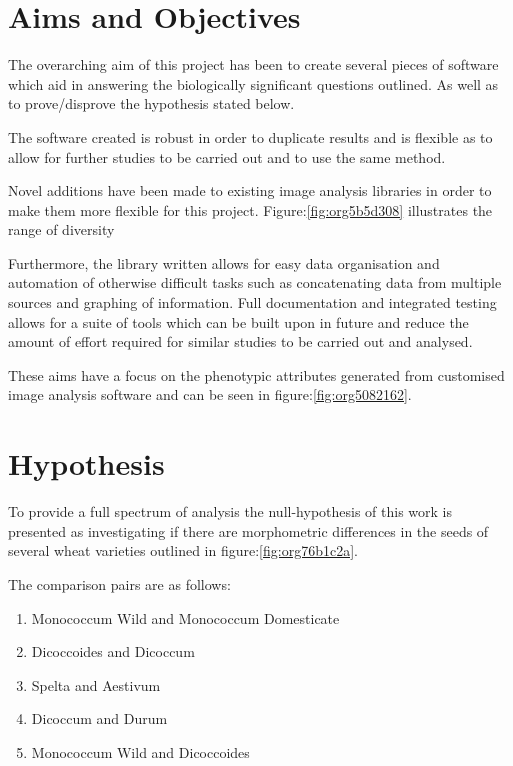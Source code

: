 \documentclass[11pt]{report}
\begin{document}
\section{Aims and Objectives}
\label{sec:orge7425c1}

The overarching aim of this project has been to create several pieces of software which aid in answering the biologically significant questions outlined. As well as to prove/disprove the hypothesis stated below.

The software created is robust in order to duplicate results and is flexible as to allow for further studies to be carried out and to use the same method.

Novel additions have been made to existing image analysis libraries in order to make them more flexible for this project. Figure:\ref{fig:org5b5d308} illustrates the range of diversity

Furthermore, the library written allows for easy data organisation and automation of otherwise difficult tasks such as concatenating data from multiple sources and graphing of information. Full documentation and integrated testing allows for a suite of tools which can be built upon in future and reduce the amount of effort required for similar studies to be carried out and analysed.

These aims have a focus on the phenotypic attributes generated from customised image analysis software \cite{Hughes2017} and can be seen in figure:\ref{fig:org5082162}.


\section{Hypothesis}
\label{sec:orge9705a6}
To provide a full spectrum of analysis the null-hypothesis of this work is presented as investigating if there are morphometric differences in the seeds of several wheat varieties outlined in figure:\ref{fig:org76b1c2a}.

The comparison pairs are as follows:

\begin{enumerate}
\item Monococcum Wild and Monococcum Domesticate
\item Dicoccoides and Dicoccum
\item Spelta and Aestivum
\item Dicoccum and Durum
\item Monococcum Wild and Dicoccoides
\end{enumerate}
\end{document}

